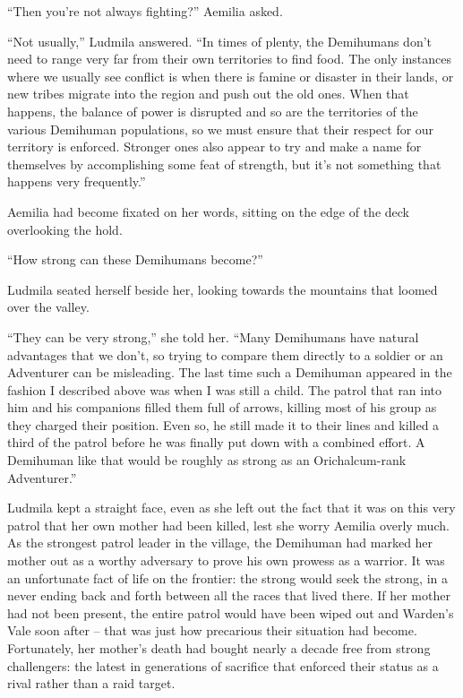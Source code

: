  

“Then you’re not always fighting?” Aemilia asked.

 

“Not usually,” Ludmila answered. “In times of plenty, the Demihumans don’t need to range very far from their own territories to find food. The only instances where we usually see conflict is when there is famine or disaster in their lands, or new tribes migrate into the region and push out the old ones. When that happens, the balance of power is disrupted and so are the territories of the various Demihuman populations, so we must ensure that their respect for our territory is enforced. Stronger ones also appear to try and make a name for themselves by accomplishing some feat of strength, but it’s not something that happens very frequently.”

 

Aemilia had become fixated on her words, sitting on the edge of the deck overlooking the hold.

 

“How strong can these Demihumans become?”

Ludmila seated herself beside her, looking towards the mountains that loomed over the valley.

 

“They can be very strong,” she told her. “Many Demihumans have natural advantages that we don’t, so trying to compare them directly to a soldier or an Adventurer can be misleading. The last time such a Demihuman appeared in the fashion I described above was when I was still a child. The patrol that ran into him and his companions filled them full of arrows, killing most of his group as they charged their position. Even so, he still made it to their lines and killed a third of the patrol before he was finally put down with a combined effort. A Demihuman like that would be roughly as strong as an Orichalcum-rank Adventurer.”

 

Ludmila kept a straight face, even as she left out the fact that it was on this very patrol that her own mother had been killed, lest she worry Aemilia overly much. As the strongest patrol leader in the village, the Demihuman had marked her mother out as a worthy adversary to prove his own prowess as a warrior. It was an unfortunate fact of life on the frontier: the strong would seek the strong, in a never ending back and forth between all the races that lived there. If her mother had not been present, the entire patrol would have been wiped out and Warden’s Vale soon after – that was just how precarious their situation had become. Fortunately, her mother’s death had bought nearly a decade free from strong challengers: the latest in generations of sacrifice that enforced their status as a rival rather than a raid target.

